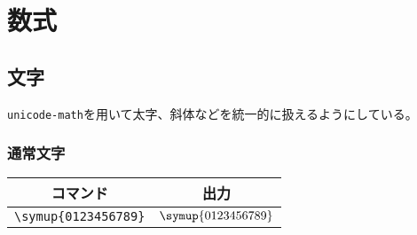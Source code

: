 \chapter{数式}

\section{文字}

\verb|unicode-math|を用いて太字、斜体などを統一的に扱えるようにしている。

\subsection{通常文字}

\begin{table}[htbp]
    \centering
    \begin{tabular}{cc}
        \toprule
        コマンド                  & 出力                   \\
        \midrule
        \verb|\symup{0123456789}| & \(\symup{0123456789}\) \\
        \bottomrule
    \end{tabular}
\end{table}


